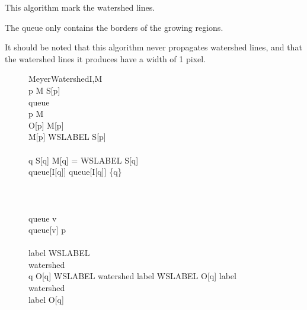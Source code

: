 \documentclass{InsightArticle}
\begin{document}
This algorithm mark the watershed lines.

The queue only contains the borders of the growing regions.

It should be noted that this algorithm never propagates watershed
lines, and that the watershed lines it produces have a width of 1 pixel.

\begin{figure}[htbp]
\centering
\small
\begin{pseudocode}[framebox]{MeyerWatershed}{I,M}
 \\
\FOREACH p \in M \DO
  S[p] \GETS \FALSE \\
queue \GETS \emptyset \\
\FOREACH p \in M \DO
\BEGIN
  \\
  O[p] \GETS M[p] \\
  \IF M[p] \neq WSLABEL
  \THEN
  \BEGIN
    S[p] \GETS \TRUE \\
    \\
    \FOREACH q \in {} \DO
    \BEGIN
      \IF \neg S[q] \AND M[q] = WSLABEL 
      \THEN
      \BEGIN
        S[q] \GETS \TRUE \\
        queue[I[q]] \GETS queue[I[q]] \cup \{q\} \\
      \END
    \END
  \END
\END
\\
\\
 \\
\WHILE queue \neq \emptyset \DO
\BEGIN
  v \GETS {}\\
  \WHILE queue[v] \neq \emptyset \DO
  \BEGIN
    p \GETS {} \\
     \\
    label \GETS WSLABEL \\
    watershed \GETS \FALSE \\
    \FOREACH q \in {} \DO
    \BEGIN
      \IF O[q] \neq WSLABEL \AND \neg watershed
      \THEN
        \BEGIN
        \IF label \neq WSLABEL \AND O[q] \neq label \\
        \THEN
          watershed \GETS \TRUE \\
        \ELSE
          label \GETS O[q] \\
        \END
    \END \\
     \\

\end{pseudocode}
\end{figure}
\end{document}
